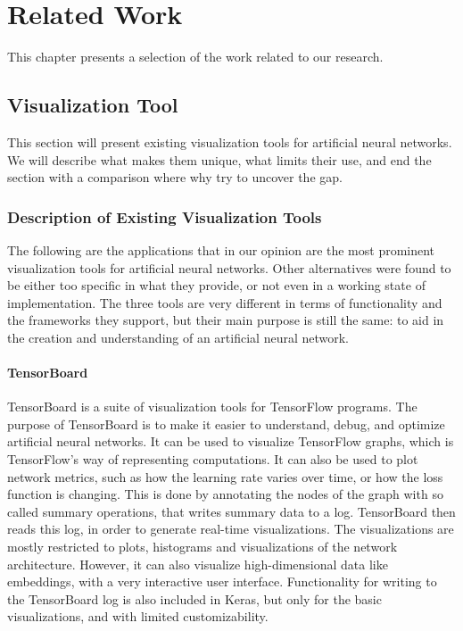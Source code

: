 
\chapter{Related Work}

This chapter presents a selection of the work related to our research.

\section{Visualization Tool}

This section will present existing visualization tools for artificial neural networks. We will describe what makes them unique, what limits their use, and end the section with a comparison where why try to uncover the gap.

\subsection{Description of Existing Visualization Tools}

The following are the applications that in our opinion are the most prominent visualization tools for artificial neural networks. Other alternatives were found to be either too specific in what they provide, or not even in a working state of implementation. The three tools are very different in terms of functionality and the frameworks they support, but their main purpose is still the same: to aid in the creation and understanding of an artificial neural network.

\subsubsection{TensorBoard}

TensorBoard is a suite of visualization tools for TensorFlow programs. The purpose of TensorBoard is to make it easier to understand, debug, and optimize artificial neural networks. It can be used to visualize TensorFlow graphs, which is TensorFlow's way of representing computations. It can also be used to plot network metrics, such as how the learning rate varies over time, or how the loss function is changing. This is done by annotating the nodes of the graph with so called summary operations, that writes summary data to a log. TensorBoard then reads this log, in order to generate real-time visualizations. The visualizations are mostly restricted to plots, histograms and visualizations of the network architecture. However, it can also visualize high-dimensional data like embeddings, with a very interactive user interface. Functionality for writing to the TensorBoard log is also included in Keras, but only for the basic visualizations, and with limited customizability.


